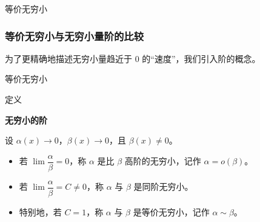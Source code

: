 \documentclass[aspectratio=169,10pt,fontset=fandol]{ctexbeamer}
\newenvironment{custom}[1]{\par\noindent\textbf{#1}\quad}{\par\vspace{0.8em}}
\begin{document}
\begin{frame}[t,fragile]{等价无穷小}
\normalsize
{\normalsize
\subsubsection{等价无穷小与无穷小量阶的比较}


}
{\normalsize
为了更精确地描述无穷小量趋近于 0 的“速度”，我们引入阶的概念。


}
\end{frame}
\begin{frame}[t,fragile]{等价无穷小}
\normalsize
\begin{block}{定义}
{\normalsize
\textbf{无穷小的阶}\par

设 \(\alpha(x) \to 0\)，\(\beta(x) \to 0\)，且 \(\beta(x) \neq 0\)。
\begin{itemize}
\item 若 \(\lim \dfrac{\alpha}{\beta} = 0\)，称 \(\alpha\) 是比 \(\beta\) 高阶的无穷小，记作 \(\alpha = o(\beta)\)。
\item 若 \(\lim \dfrac{\alpha}{\beta} = C \neq 0\)，称 \(\alpha\) 与 \(\beta\) 是同阶无穷小。
\item 特别地，若 \(C = 1\)，称 \(\alpha\) 与 \(\beta\) 是等价无穷小，记作 \(\alpha \sim \beta\)。
\end{itemize}

}
\end{block}
\end{frame}
\end{document}

